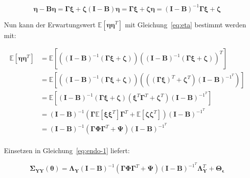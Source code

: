 \documentclass{article}
\numberwithin{equation}{section}
\begin{document}
\begin{subequations}
\begin{equation}
\boldsymbol\eta - \boldsymbol{B \eta} = \boldsymbol{\Gamma \xi} + \boldsymbol\zeta
\end{equation}
\begin{equation}
(\mathbf{I} - \mathbf{B}) \boldsymbol\eta = \boldsymbol{\Gamma \xi} + \boldsymbol\zeta
\end{equation}
\begin{equation}
\label{eq:eta}
\boldsymbol\eta = (\mathbf{I} - \mathbf{B})^{-1} \boldsymbol{\Gamma \xi} + \boldsymbol\zeta
\end{equation}
\end{subequations}

Nun kann der Erwartungswert $\mathbb{E} \left[ \boldsymbol{\eta\eta}^T \right]$ mit Gleichung~\ref{eq:eta} bestimmt werden mit:

\begin{equation}
\begin{split}
\mathbb{E} \left[ \boldsymbol{\eta\eta}^T \right] &= \mathbb{E} \left[ \left( (\mathbf{I} - \mathbf{B})^{-1} (\boldsymbol{\Gamma \xi} + \boldsymbol\zeta) \right) \left( (\mathbf{I} - \mathbf{B})^{-1} (\boldsymbol{\Gamma \xi} + \boldsymbol\zeta) \right)^T \right]\\
&= \mathbb{E} \left[ \left( (\mathbf{I} - \mathbf{B})^{-1} (\boldsymbol{\Gamma \xi} + \boldsymbol\zeta) \right) \left( ((\boldsymbol{\Gamma \xi})^T + \boldsymbol\zeta^T) (\mathbf{I} - \mathbf{B})^{{-1}^T} \right) \right]\\
&= \mathbb{E} \left[ (\mathbf{I} - \mathbf{B})^{-1} (\boldsymbol{\Gamma \xi} + \boldsymbol\zeta) ( \boldsymbol\xi^T \boldsymbol\Gamma^T + \boldsymbol\zeta^T) (\mathbf{I} - \mathbf{B})^{{-1}^T} \right]\\
&= (\mathbf{I} - \mathbf{B})^{-1} (\boldsymbol\Gamma \mathbb{E} \left[ \boldsymbol\xi \boldsymbol\xi^T \right] \boldsymbol\Gamma^T + \mathbb{E} \left[ \boldsymbol\zeta \boldsymbol\zeta^T \right]) (\mathbf{I} - \mathbf{B})^{{-1}^T}\\
&= (\mathbf{I} - \mathbf{B})^{-1} (\boldsymbol\Gamma \boldsymbol\Phi \boldsymbol\Gamma^T + \boldsymbol\Psi) (\mathbf{I} - \mathbf{B})^{{-1}^T}\\
\end{split}
\end{equation}

Einsetzen in Gleichung~\ref{eq:endo-1} liefert:

\begin{equation}
\label{eq:kovar-yy}
\boldsymbol\Sigma_{\mathbf{YY}}(\boldsymbol\theta) = \boldsymbol\Lambda_{\mathbf{Y}} (\mathbf{I} - \mathbf{B})^{-1} (\boldsymbol\Gamma \boldsymbol\Phi \boldsymbol\Gamma^T + \boldsymbol\Psi) (\mathbf{I} - \mathbf{B})^{{-1}^T} \boldsymbol\Lambda_{\mathbf{Y}}^T + \boldsymbol\Theta_{\boldsymbol\epsilon}
\end{equation}
\end{document}
